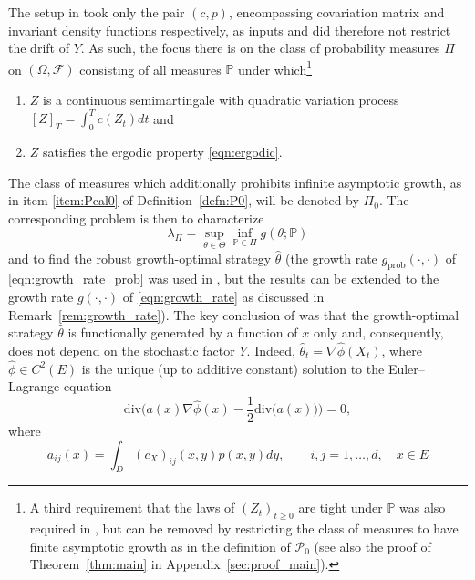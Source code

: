 \documentclass{article}
\theoremstyle{plain}
\theoremstyle{definition}
\renewcommand{\P}{\mathbb{P}}
\newcommand{\F}{\mathcal{F}}
\newcommand{\Pcal}{{\mathcal P}}
\numberwithin{lem}{section}
\begin{document}
The setup in \cite[Section~5.2]{itkin2025ergodic} took only the pair $(c,p)$, encompassing covariation matrix and invariant density functions respectively, as inputs and did therefore not restrict the drift of $Y$. As such, the focus there is on the class of probability measures $\Pi$ on $(\Omega,\F)$ consisting of all measures $\P$ under which\footnote{A third requirement that the laws of $(Z_t)_{t \geq 0}$ are tight under $\P$ was also required in \cite{itkin2025ergodic}, but can be removed by restricting the class of measures to have finite asymptotic growth as in the definition of $\Pcal_0$ (see also the proof of Theorem~\ref{thm:main} in Appendix~\ref{sec:proof_main}).}
\begin{enumerate}[noitemsep]
    \item \label{item:QV} $Z$ is a continuous semimartingale with quadratic variation process $ 
    [Z]_T  = \int_0^Tc(Z_t)dt$ and
    \item $Z$ satisfies the ergodic property \eqref{eqn:ergodic}. 
\end{enumerate}
The class of measures which additionally prohibits infinite asymptotic growth, as in item \ref{item:Pcal0} of Definition~\ref{defn:P0}, will be denoted by $\Pi_0$. 
The corresponding problem is then to characterize
\begin{equation}
    \lambda_{\Pi} = \sup_{\theta \in \Theta}\inf_{\P \in \Pi} g(\theta;\P)
\end{equation}
and to find the robust growth-optimal strategy $\widehat \theta$ (the growth rate $g_{\mathrm{prob}}(\cdot,\cdot)$ of \eqref{eqn:growth_rate_prob} was used in \cite{itkin2025ergodic}, but the results can be extended to the growth rate $g(\cdot,\cdot)$ of \eqref{eqn:growth_rate} as discussed in Remark~\ref{rem:growth_rate}). The key conclusion of \cite{itkin2025ergodic} was that the growth-optimal strategy $\widehat \theta$ is functionally generated by a function of $x$ only and, consequently, does not depend on the stochastic factor $Y$. Indeed, $\widehat \theta_t = \nabla \widehat \phi(X_t)$, where $\widehat \phi \in C^2(E)$ is the unique (up to additive constant) solution to the Euler--Lagrange equation
\begin{equation} \label{eqn:Euler_Lagrange_x}
\mathrm{div}\Big(a(x)\nabla \widehat \phi(x) - \frac{1}{2}\mathrm{div}\big(a(x)\big)\Big) = 0,
\end{equation}
where
\begin{equation} \label{eqn:a} 
a_{ij}(x) = \int_D (c_X)_{ij}(x,y)p(x,y)dy, \qquad i,j=1,\dots,d, \quad x \in E
\end{equation}
\end{document}
